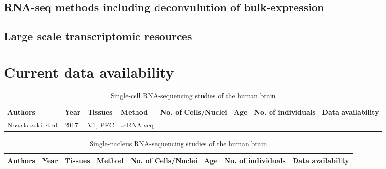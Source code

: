 \documentclass[12pt]{article}
\begin{document}
\subsection{RNA-seq methods including deconvulution of bulk-expression}

\subsection{Large scale transcriptomic resources}



\section{Current data availability}

\begin{landscape}
	\begin{table}[!htp]
		\centering
		\footnotesize
		\caption{Single-cell RNA-sequencing studies of the human brain}
		\begin{tabular}{|l|l|l|l|l|l|l|l|}
			\hline
			\textbf{Authors} &\textbf{Year}  & \textbf{Tissues} & \textbf{Method} & \textbf{No. of Cells/Nuclei}  & \textbf{Age} &  \textbf{No. of individuals} & \textbf{Data availability}  \\ \hline
			Nowakozski et al & 2017 &V1, PFC & scRNA-seq     & &&& \\ \hline
		\end{tabular}
	\end{table}
\end{landscape}



\begin{landscape}
	\begin{table}[!htp]
		\centering
		\footnotesize
		\caption{Single-nucleus RNA-sequencing studies of the human brain}
		\begin{tabular}{|l|l|l|l|l|l|l|l|}
			\hline
			\textbf{Authors} &\textbf{Year}  & \textbf{Tissues} & \textbf{Method} & \textbf{No. of Cells/Nuclei}  & \textbf{Age} &  \textbf{No. of individuals} & \textbf{Data availability}  \\ \hline
		\end{tabular}
	\end{table}
\end{landscape}
\end{document}
